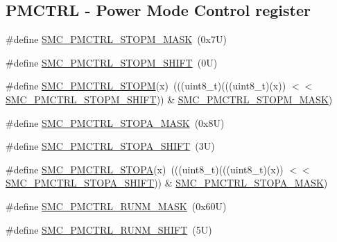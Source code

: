 \subsection*{P\+M\+C\+T\+RL -\/ Power Mode Control register}
\begin{DoxyCompactItemize}
\item 
\#define \mbox{\hyperlink{group___s_m_c___register___masks_ga8df79d8a16a6d12e3b343eec59d9453c}{S\+M\+C\+\_\+\+P\+M\+C\+T\+R\+L\+\_\+\+S\+T\+O\+P\+M\+\_\+\+M\+A\+SK}}~(0x7\+U)
\item 
\#define \mbox{\hyperlink{group___s_m_c___register___masks_gaac7423086f31a8fbbfc8d18b1a876f26}{S\+M\+C\+\_\+\+P\+M\+C\+T\+R\+L\+\_\+\+S\+T\+O\+P\+M\+\_\+\+S\+H\+I\+FT}}~(0\+U)
\item 
\#define \mbox{\hyperlink{group___s_m_c___register___masks_gaa2ea36f819a21ef6b513564dc1453958}{S\+M\+C\+\_\+\+P\+M\+C\+T\+R\+L\+\_\+\+S\+T\+O\+PM}}(x)~(((uint8\+\_\+t)(((uint8\+\_\+t)(x)) $<$$<$ \mbox{\hyperlink{group___s_m_c___register___masks_gaac7423086f31a8fbbfc8d18b1a876f26}{S\+M\+C\+\_\+\+P\+M\+C\+T\+R\+L\+\_\+\+S\+T\+O\+P\+M\+\_\+\+S\+H\+I\+FT}})) \& \mbox{\hyperlink{group___s_m_c___register___masks_ga8df79d8a16a6d12e3b343eec59d9453c}{S\+M\+C\+\_\+\+P\+M\+C\+T\+R\+L\+\_\+\+S\+T\+O\+P\+M\+\_\+\+M\+A\+SK}})
\item 
\#define \mbox{\hyperlink{group___s_m_c___register___masks_gadd72ad662b62a7b51225b529fef2c77a}{S\+M\+C\+\_\+\+P\+M\+C\+T\+R\+L\+\_\+\+S\+T\+O\+P\+A\+\_\+\+M\+A\+SK}}~(0x8\+U)
\item 
\#define \mbox{\hyperlink{group___s_m_c___register___masks_gadfe89210f121f10b74f2fba55f059e1d}{S\+M\+C\+\_\+\+P\+M\+C\+T\+R\+L\+\_\+\+S\+T\+O\+P\+A\+\_\+\+S\+H\+I\+FT}}~(3\+U)
\item 
\#define \mbox{\hyperlink{group___s_m_c___register___masks_gaf2a78629f2034b26e237c45e889e122e}{S\+M\+C\+\_\+\+P\+M\+C\+T\+R\+L\+\_\+\+S\+T\+O\+PA}}(x)~(((uint8\+\_\+t)(((uint8\+\_\+t)(x)) $<$$<$ \mbox{\hyperlink{group___s_m_c___register___masks_gadfe89210f121f10b74f2fba55f059e1d}{S\+M\+C\+\_\+\+P\+M\+C\+T\+R\+L\+\_\+\+S\+T\+O\+P\+A\+\_\+\+S\+H\+I\+FT}})) \& \mbox{\hyperlink{group___s_m_c___register___masks_gadd72ad662b62a7b51225b529fef2c77a}{S\+M\+C\+\_\+\+P\+M\+C\+T\+R\+L\+\_\+\+S\+T\+O\+P\+A\+\_\+\+M\+A\+SK}})
\item 
\#define \mbox{\hyperlink{group___s_m_c___register___masks_ga1a456925e291d6d53f4891b25fcaf8eb}{S\+M\+C\+\_\+\+P\+M\+C\+T\+R\+L\+\_\+\+R\+U\+N\+M\+\_\+\+M\+A\+SK}}~(0x60\+U)
\item 
\#define \mbox{\hyperlink{group___s_m_c___register___masks_ga8f8dc472f4a4b6ad1babae518c44d55e}{S\+M\+C\+\_\+\+P\+M\+C\+T\+R\+L\+\_\+\+R\+U\+N\+M\+\_\+\+S\+H\+I\+FT}}~(5\+U)

\end{DoxyCompactItemize}
